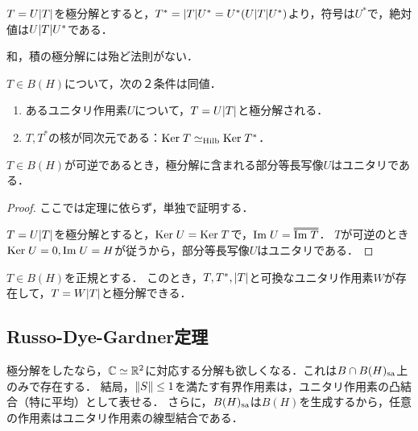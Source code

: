 \documentclass[uplatex,dvipdfmx]{jsreport}
\begin{document}
\begin{corollary}[随伴作用素の極分解]
    $T=U\lvert T\rvert$を極分解とすると，$T^*=\lvert T\rvert U^*=U^*(U\lvert T\rvert U^*)$より，符号は$U^*$で，絶対値は$U\lvert T\rvert U^*$である．
\end{corollary}
\begin{remark}
    和，積の極分解には殆ど法則がない．
\end{remark}

\begin{theorem}
    $T\in B(H)$について，次の２条件は同値．
    \begin{enumerate}
        \item あるユニタリ作用素$U$について，$T=U\lvert T\rvert$と極分解される．
        \item $T,T^*$の核が同次元である：$\mathrm{Ker}\; T\simeq_{\mathrm{Hilb}}\mathrm{Ker}\; T^*$．
    \end{enumerate}
\end{theorem}

\begin{corollary}\label{cor-polar-decomposition-of-invertible-operators}
    $T\in B(H)$が可逆であるとき，極分解に含まれる部分等長写像$U$はユニタリである．
\end{corollary}
\begin{proof}
    ここでは定理に依らず，単独で証明する．

    $T=U\lvert T\rvert$を極分解とすると，$\mathrm{Ker}\; U=\mathrm{Ker}\; T$で，$\Im U=\oo{\Im T}$．
    $T$が可逆のとき$\mathrm{Ker}\; U=0,\mathrm{Im}\; U=H$が従うから，部分等長写像$U$はユニタリである．
\end{proof}

\begin{corollary}
    $T\in B(H)$を正規とする．
    このとき，$T,T^*,\lvert T\rvert$と可換なユニタリ作用素$W$が存在して，$T=W\lvert T\rvert$と極分解できる．
\end{corollary}

\subsection{Russo-Dye-Gardner定理}

\begin{tcolorbox}[colframe=ForestGreen, colback=ForestGreen!10!white,breakable,colbacktitle=ForestGreen!40!white,coltitle=black,fonttitle=\bfseries\sffamily,
title=ユニタリ作用素への分解]
    極分解をしたなら，$\mathbb{C}\simeq\mathbb{R}^2$に対応する分解も欲しくなる．これは$B\cap B(H)_{\mathrm{sa}}$上のみで存在する．
    結局，$\|S\|\le 1$を満たす有界作用素は，ユニタリ作用素の凸結合（特に平均）として表せる．
    さらに，$B(H)_{\mathrm{sa}}$は$B(H)$を生成するから，任意の作用素はユニタリ作用素の線型結合である．
\end{tcolorbox}
\end{document}
